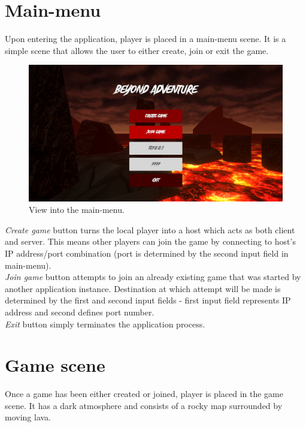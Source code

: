 \documentclass[times, utf8, diplomski]{fer}
\begin{document}
\section{Main-menu}
Upon entering the application, player is placed in a main-menu scene. It is a simple scene that allows the user to either create, join or exit the game.

\begin{figure}[H]
	\centering
	\includegraphics[scale=0.5]{MainMenu}
	\caption{View into the main-menu.}
\end{figure}

\textit{Create game} button turns the local player into a host which acts as both client and server. This means other players can join the game by connecting to host's IP address/port combination (port is determined by the second input field in main-menu).\\

\textit{Join game} button attempts to join an already existing game that was started by another application instance. Destination at which attempt will be made is determined by the first and second input fields - first input field represents IP address and second defines port number.\\

\textit{Exit} button simply terminates the application process.

\section{Game scene}
Once a game has been either created or joined, player is placed in the game scene. It has a dark atmosphere and consists of a rocky map surrounded by moving lava.\\
\end{document}
